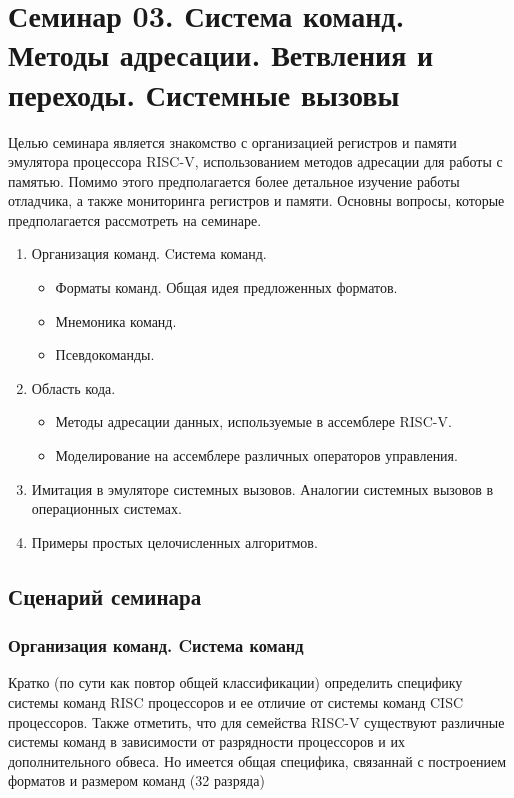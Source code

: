 \chapter[Система команд. Управление ветвлениями. Системные вызовы]{Семинар 03. Система команд. Методы адресации. Ветвления и переходы. Системные вызовы}

Целью семинара является знакомство с организацией регистров и памяти эмулятора процессора RISC-V, использованием методов адресации для работы с памятью. Помимо этого предполагается более детальное изучение работы отладчика, а также мониторинга регистров и памяти. Основны вопросы, которые предполагается рассмотреть на семинаре.


\begin{enumerate}
    \item Организация команд. Cистема команд.
    \begin{itemize}
        \item Форматы команд. Общая идея предложенных форматов.
        \item Мнемоника команд.
        \item Псевдокоманды.
    \end{itemize}
    \item Область кода.
    \begin{itemize}
        \item Методы адресации данных, используемые в ассемблере RISC-V.
        \item Моделирование на ассемблере различных операторов управления.
    \end{itemize}
    \item Имитация в эмуляторе системных вызовов. Аналогии системных вызовов в операционных системах.
    \item Примеры простых целочисленных алгоритмов.
\end{enumerate}

\section{Сценарий семинара}

\subsection{Организация команд. Cистема команд}
Кратко (по сути как повтор общей классификации) определить специфику системы команд RISC процессоров и ее отличие от системы команд CISC процессоров. Также отметить, что для семейства RISC-V существуют различные системы команд в зависимости от разрядности процессоров и их дополнительного обвеса. Но имеется общая специфика, связаннай с построением форматов и размером команд (32 разряда)

